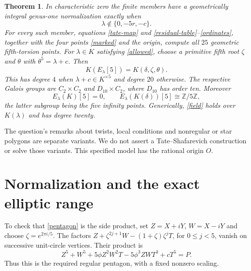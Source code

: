 \documentclass[11pt]{article}
\newtheorem{theorem}{Theorem}
\begin{document}
\begin{theorem}\label{main}
In characteristic zero the finite members have a geometrically integral
genus-one normalization exactly when
\begin{equation}\label{allowed}
\lambda\notin\{0,-5r,-c\}.
\end{equation}
For every such member, equations \eqref{tate-map} and
\eqref{residual-table}--\eqref{ordinates}, together with the four points
\eqref{marked} and the origin, compute all $25$ geometric fifth-torsion
points. For $\lambda\in K$ satisfying \eqref{allowed}, choose a primitive
fifth root $\zeta$ and $\theta$ with $\theta^5=\lambda+c$. Then
\begin{equation}\label{field}
K(E_\lambda[5])=K(\delta,\zeta,\theta).
\end{equation}
This has degree $4$ when $\lambda+c\in K^{\times5}$ and degree $20$
otherwise. The respective Galois groups are $C_2\times C_2$ and
$D_{10}\times C_2$, where $D_{10}$ has order ten. Moreover
\begin{equation}\label{rational}
E_\lambda(K)[5]=0,\qquad
E_\lambda(K(\delta))[5]\cong\mathbb Z/5\mathbb Z,
\end{equation}
the latter subgroup being the five infinity points. Generically,
\eqref{field} holds over $K(\lambda)$ and has degree twenty.
\end{theorem}

The question's remarks about twists, local conditions and nonregular or
star polygons are separate variants. We do not assert a
Tate--Shafarevich construction or solve those variants. This specified
model has the rational origin $O$.

\section{Normalization and the exact elliptic range}
To check that \eqref{pentagon} is the side product, set $Z=X+iY$,
$W=X-iY$ and choose $\zeta=e^{2\pi i/5}$. The factors
$Z+\zeta^{2j+1}W-(1+\zeta)\zeta^jT$, for $0\le j<5$, vanish on
successive unit-circle vertices. Their product is
\[
Z^5+W^5+5\phi Z^2W^2T-5\phi^3ZWT^3+cT^5=P.
\]
Thus this is the required regular pentagon, with a fixed nonzero scaling.
\end{document}
